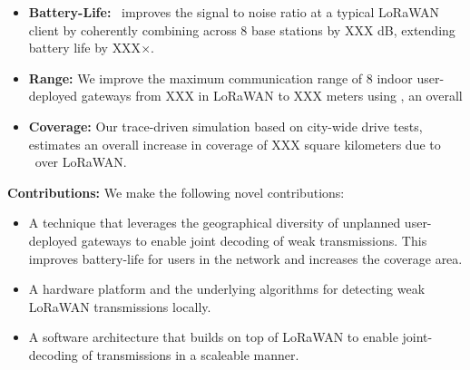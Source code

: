 \begin{itemize}
    \item {\bf Battery-Life: }\name\ improves the signal to noise ratio at a typical LoRaWAN client by coherently combining across 8 base stations by {\color{red} XXX dB}, extending battery life by {\color{red}XXX}$\times$.
    \item {\bf Range: } We improve the maximum communication range of 8 indoor user-deployed gateways from {\color{red}XXX} in LoRaWAN to {\color{red}XXX} meters using \name, an overall 
\item {\bf Coverage: } Our trace-driven simulation based on city-wide drive tests, estimates an overall increase in coverage of XXX square kilometers due to \name\ over LoRaWAN. 
\end{itemize}


\textbf{Contributions:} We make the following novel contributions:
\begin{itemize}
    \item A technique that leverages the geographical diversity of unplanned
    user-deployed gateways to enable joint decoding of weak transmissions.
    This improves battery-life for  users in the network and increases the coverage area.
    \item A hardware platform and the underlying algorithms for detecting weak LoRaWAN transmissions locally. 
    \item A software architecture that builds on top of LoRaWAN to enable
    joint-decoding of transmissions in a scaleable manner.
\end{itemize}


















